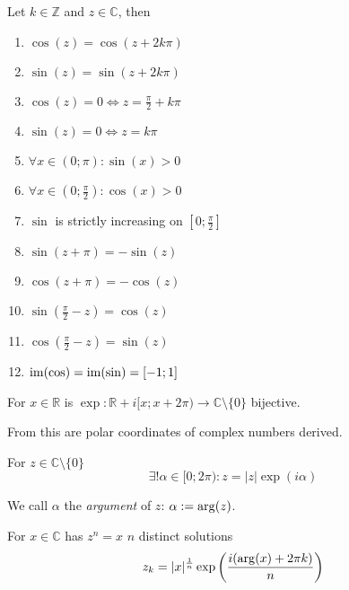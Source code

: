 \begin{proposition}[Properties]
   Let \(k \in \mathbb{Z}\) and \(z \in \mathbb{C}\), then
   \begin{enumerate}[label=\roman*, align=Center]
      \item \(\cos(z) = \cos(z + 2k\pi)\)
      \item \(\sin(z) = \sin(z + 2k\pi)\)
      \item \(\cos(z) = 0 \iff z = \frac{\pi}{2} + k\pi\)
      \item \(\sin(z) = 0 \iff z = k\pi\)
      \item \(\forall x \in (0; \pi): \sin(x) > 0\)
      \item \(\forall x \in \left(0; \frac{\pi}{2}\right): \cos(x) > 0\)
      \item \(\sin\) is strictly increasing on \(\left[0; \frac{\pi}{2}\right]\)
      \item \(\sin(z + \pi) = -\sin(z)\)
      \item \(\cos(z + \pi) = -\cos(z)\)
      \item \(\sin\left(\frac{\pi}{2} - z\right) = \cos(z)\)
      \item \(\cos\left(\frac{\pi}{2} - z\right) = \sin(z)\)
      \item \(\operatorname{im}(\cos) = \operatorname{im}(\sin) = [-1;1]\)
   \end{enumerate}
\end{proposition}

\begin{theorem}
   For \(x \in \mathbb{R}\) is \(\exp: \mathbb{R} + i[x; x + 2\pi) \to \mathbb{C}\setminus\{0\}\) bijective.
\end{theorem}
\begin{remark}
   From this are polar coordinates of complex numbers derived.
\end{remark}

\begin{theorem}
   For \(z \in \mathbb{C}\setminus\{0\}\)
   \[\exists! \alpha \in [0; 2\pi): z = \lvert z\rvert \exp(i \alpha)\]
\end{theorem}
\begin{remark}
   We call \(\alpha\) the \emph{argument} of \(z\): \(\alpha := \operatorname{arg}(z)\).
\end{remark}

\begin{theorem}
   For \(x \in \mathbb{C}\) has \(z^n = x\) \(n\) distinct solutions
   \[z_k = \lvert x\rvert^\frac{1}{n} \exp\left(\frac{i(\operatorname{arg}(x) + 2\pi k)}{n}\right)\]
\end{theorem}


